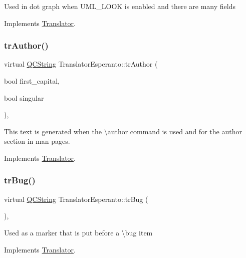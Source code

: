 Used in dot graph when U\+M\+L\+\_\+\+L\+O\+OK is enabled and there are many fields 

Implements \mbox{\hyperlink{class_translator}{Translator}}.

\mbox{\label{class_translator_esperanto_ac54a34dda9e8ffffbbce95d6449f24d3}} 
\subsubsection{\texorpdfstring{trAuthor()}{trAuthor()}}
{\footnotesize\ttfamily virtual \mbox{\hyperlink{class_q_c_string}{Q\+C\+String}} Translator\+Esperanto\+::tr\+Author (\begin{DoxyParamCaption}\item[{bool}]{first\+\_\+capital,  }\item[{bool}]{singular }\end{DoxyParamCaption})\hspace{0.3cm}{\ttfamily [inline]}, {\ttfamily [virtual]}}

This text is generated when the \textbackslash{}author command is used and for the author section in man pages. 

Implements \mbox{\hyperlink{class_translator}{Translator}}.

\mbox{\label{class_translator_esperanto_aefa841351e1f876d13477f8738937c4e}} 
\subsubsection{\texorpdfstring{trBug()}{trBug()}}
{\footnotesize\ttfamily virtual \mbox{\hyperlink{class_q_c_string}{Q\+C\+String}} Translator\+Esperanto\+::tr\+Bug (\begin{DoxyParamCaption}{ }\end{DoxyParamCaption})\hspace{0.3cm}{\ttfamily [inline]}, {\ttfamily [virtual]}}

Used as a marker that is put before a \textbackslash{}bug item 

Implements \mbox{\hyperlink{class_translator}{Translator}}.

\mbox{\label{class_translator_esperanto_a282cf1d72cc91e3d8a9789c6d235c46b}} 
